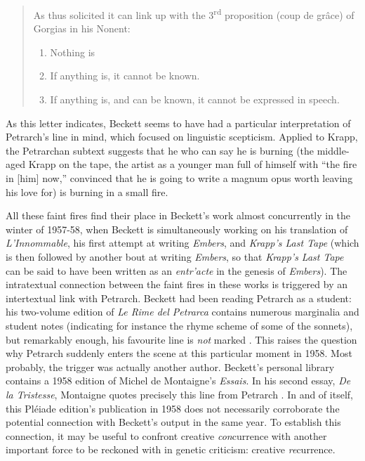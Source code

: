 \begin{paper}
\begin{quote}
As thus solicited it can link up with the 3\textsuperscript{rd}
proposition (coup de grâce) of Gorgias in his Nonent:
\begin{enumerate}
\item Nothing is

\item If anything is, it cannot be known.

\item If anything is, and can be known, it cannot be expressed in speech.
\end{enumerate}
\begin{flushright}
\citep[136]{beckett_letters_2014}
\end{flushright}
\end{quote}

\noindent As this letter indicates, Beckett seems to have had a particular
interpretation of Petrarch's line in mind, which focused on linguistic
scepticism. Applied to Krapp, the Petrarchan subtext suggests that he
who can say he is burning (the middle-aged Krapp on the tape, the artist
as a younger man full of himself with ``the fire in {[}him{]} now,''
convinced that he is going to write a magnum opus worth leaving his love
for) is burning in a small fire.

All these faint fires find their place in Beckett's work almost
concurrently in the winter of 1957-58, when Beckett is simultaneously
working on his translation of \emph{L'Innommable}, his first attempt at
writing \emph{Embers}, and \emph{Krapp's Last Tape} (which is then
followed by another bout at writing \emph{Embers}, so that \emph{Krapp's
Last Tape} can be said to have been written as an \emph{entr'acte} in
the genesis of \emph{Embers}). The intratextual connection between the
faint fires in these works is triggered by an intertextual link with
Petrarch. Beckett had been reading Petrarch as a student: his two-volume
edition of \emph{Le Rime del Petrarca} 
contains numerous marginalia and student notes (indicating for instance
the rhyme scheme of some of the sonnets), but remarkably enough, his
favourite line is \emph{not} marked \citep{petrarca_rime_1824}. This raises the question why
Petrarch suddenly enters the scene at this particular moment in 1958.
Most probably, the trigger was actually another author. Beckett's
personal library contains a 1958 edition of Michel de Montaigne's
\emph{Essais}. In his second essay, \emph{De la Tristesse}, Montaigne
quotes precisely this line from Petrarch \citep[32]{montaigne_essais_1958}. In and of
itself, this Pléiade edition's publication in 1958 does not necessarily
corroborate the potential connection with Beckett's output in the same
year. To establish this connection, it may be useful to confront
creative \emph{con}currence with another important force to be reckoned
with in genetic criticism: creative \emph{re}currence.


\end{paper}
